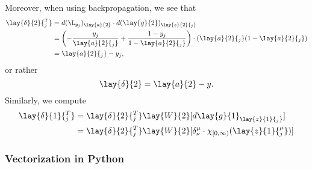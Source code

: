 Moreover, when using backpropagation, we see that
\begin{align*}
	\lay{\delta}{2}{^T_j}&=d(\L_{y_j})_{\lay{a}{2}}\cdot d(\lay{g}{2})_{\lay{z}{2}{_j}}\\
	&=\left(-\frac{y_j}{\lay{a}{2}{_j}}+\frac{1-y_j}{1-\lay{a}{2}{_j}}\right)\cdot(\lay{a}{2}{_j}(1-\lay{a}{2}{_j})\\
	&=\lay{a}{2}{_j}-y_j,
\end{align*}
or rather
$$\lay{\delta}{2}=\lay{a}{2}-y.$$
Similarly, we compute
\begin{align*}
	\lay{\delta}{1}{_j^T}&=\lay{\delta}{2}{_j^T}\lay{W}{2}[d\lay{g}{1}_{\lay{z}{1}{_j}}]\\
	&=\lay{\delta}{2}{_j^T}\lay{W}{2}[\delta^\mu_\nu\cdot\chi_{[0,\infty)}(\lay{z}{1}{^\mu_j})]
\end{align*}


\subsubsection{Vectorization in Python}


